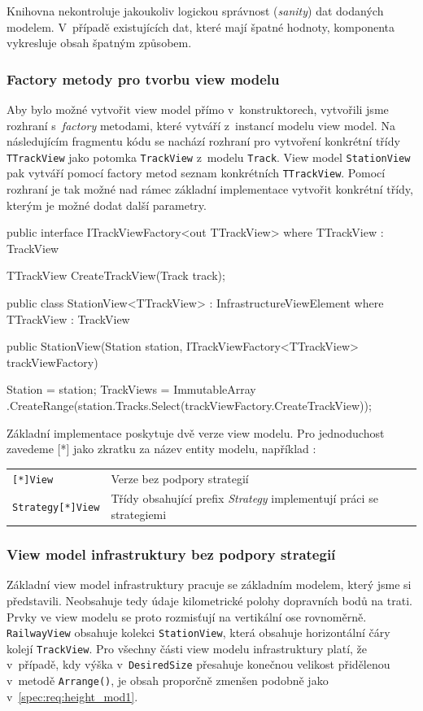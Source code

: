 Knihovna nekontroluje jakoukoliv logickou správnost (\textit{sanity}) dat dodaných modelem. V~případě existujících dat, které mají špatné hodnoty, komponenta vykresluje obsah špatným způsobem.

\subsubsection*{Factory metody pro tvorbu view modelu}
\label{kap4:view_model_factory_impl}
Aby bylo možné vytvořit view model přímo v~konstruktorech, vytvořili jsme rozhraní s~\textit{factory} metodami, které vytváří z~instancí modelu view model. Na následujícím fragmentu kódu se nachází rozhraní pro vytvoření konkrétní třídy \texttt{TTrackView} jako potomka \texttt{TrackView} z~modelu \texttt{Track}. View model \texttt{StationView} pak vytváří pomocí factory metod seznam konkrétních \texttt{TTrackView}. Pomocí rozhraní je tak možné nad rámec základní implementace vytvořit konkrétní třídy, kterým je možné dodat další parametry.

\begin{csharpcode}
public interface ITrackViewFactory<out TTrackView>
   where TTrackView : TrackView {
	
	TTrackView CreateTrackView(Track track);
}

public class StationView<TTrackView> : InfrastructureViewElement 
   where TTrackView : TrackView {
		
    public StationView(Station station,
                       ITrackViewFactory<TTrackView> trackViewFactory) {

		Station = station;
		TrackViews = ImmutableArray
		.CreateRange(station.Tracks.Select(trackViewFactory.CreateTrackView));
    }
}
\end{csharpcode}

\newpage
Základní implementace poskytuje dvě verze view modelu. Pro jednoduchost zavedeme [*] jako zkratku za název entity modelu, například :

\begin{tabular}{ m{} m{} }
\texttt{[*]View} & Verze bez podpory strategií \\
\texttt{Strategy[*]View} & Třídy obsahující prefix \textit{Strategy} implementují práci se strategiemi \\ 
\end{tabular}

\subsubsection*{View model infrastruktury bez podpory strategií}
Základní view model infrastruktury pracuje se základním modelem, který jsme si představili. Neobsahuje tedy údaje kilometrické polohy dopravních bodů na trati. Prvky ve view modelu se proto rozmisťují na vertikální ose rovnoměrně. \texttt{RailwayView} obsahuje kolekci \texttt{StationView}, která obsahuje horizontální čáry kolejí \texttt{TrackView}. Pro všechny části view modelu infrastruktury platí, že v~případě, kdy výška v~\texttt{DesiredSize} přesahuje konečnou velikost přidělenou v~metodě \texttt{Arrange()}, je obsah proporčně zmenšen podobně jako v~\ref{spec:req:height_mod1}.

